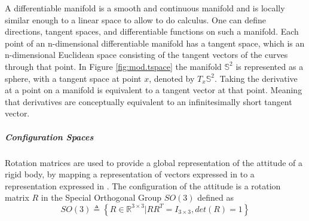 A differentiable manifold is a smooth and continuous manifold and is locally similar enough to a linear space to allow to do calculus. One can define directions, tangent spaces, and differentiable functions on such a manifold. Each point of an n-dimensional differentiable manifold has a tangent space, which is an n-dimensional Euclidean space consisting of the tangent vectors of the curves through that point. In Figure \ref{fig:mod.tspace} the manifold $ \mathbb{S}^2 $ is represented as a sphere, with a tangent space at point $ x $, denoted by $ T_x\mathbb{S}^2 $. Taking the derivative at a point on a manifold is equivalent to a tangent vector at that point. Meaning that derivatives are conceptually equivalent to an infinitesimally short tangent vector. 
\begin{figure}[h!]
	\centering
	\caption{\label{fig:}}
\end{figure}		

\subparagraph{Configuration Spaces}
Rotation matrices are used to provide a global representation of the attitude of a rigid body, by mapping a representation of vectors expressed in \BF to a representation expressed in \IF \cite{Chaturvedi2011,Murray1994}. 
The configuration of the  attitude is a rotation matrix $ R $ in the Special Orthogonal Group $ SO(3) $ defined as
\begin{equation}\label{key}
SO(3) \triangleq \left\lbrace R\in\mathbb{R}^{3\times3}|RR^T=I_{3\times3}, det(R)=1\right\rbrace 
\end{equation}



